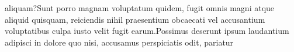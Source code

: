 \documentclass[letterpaper]{article} %
\begin{document}
aliquam?Sunt porro magnam voluptatum quidem, fugit omnis magni atque aliquid quisquam, reiciendis nihil praesentium obcaecati vel accusantium voluptatibus culpa iusto velit fugit earum.Possimus deserunt ipsum laudantium adipisci in dolore quo nisi, accusamus perspiciatis odit, pariatur

\end{document}
